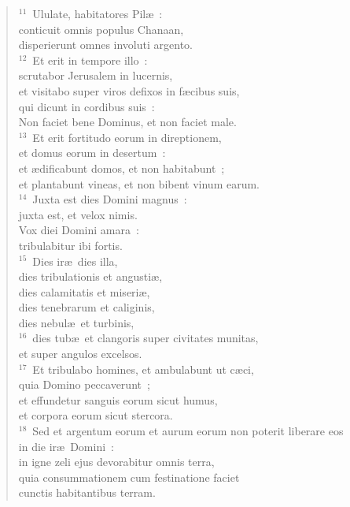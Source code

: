 \begin{verse}
${}^{11}$~Ululate, habitatores Pil\ae~:\\ conticuit omnis populus Chanaan,\\ disperierunt omnes involuti argento.\\
${}^{12}$~Et erit in tempore illo~:\\ scrutabor Jerusalem in lucernis,\\ et visitabo super viros defixos in f\ae cibus suis,\\ qui dicunt in cordibus suis~:\\ Non faciet bene Dominus, et non faciet male.\\
${}^{13}$~Et erit fortitudo eorum in direptionem,\\ et domus eorum in desertum~:\\ et \ae dificabunt domos, et non habitabunt~;\\ et plantabunt vineas, et non bibent vinum earum.\\
${}^{14}$~Juxta est dies Domini magnus~:\\ juxta est, et velox nimis.\\ Vox diei Domini amara~:\\ tribulabitur ibi fortis.\\
${}^{15}$~Dies ir\ae\ dies illa,\\ dies tribulationis et angusti\ae ,\\ dies calamitatis et miseri\ae ,\\ dies tenebrarum et caliginis,\\ dies nebul\ae\ et turbinis,\\
${}^{16}$~dies tub\ae\ et clangoris super civitates munitas,\\ et super angulos excelsos.\\
${}^{17}$~Et tribulabo homines, et ambulabunt ut c\ae ci,\\ quia Domino peccaverunt~;\\ et effundetur sanguis eorum sicut humus,\\ et corpora eorum sicut stercora.\\
${}^{18}$~Sed et argentum eorum et aurum eorum non poterit liberare eos\\ in die ir\ae\ Domini~:\\ in igne zeli ejus devorabitur omnis terra,\\ quia consummationem cum festinatione faciet\\ cunctis habitantibus terram.\end{verse}


